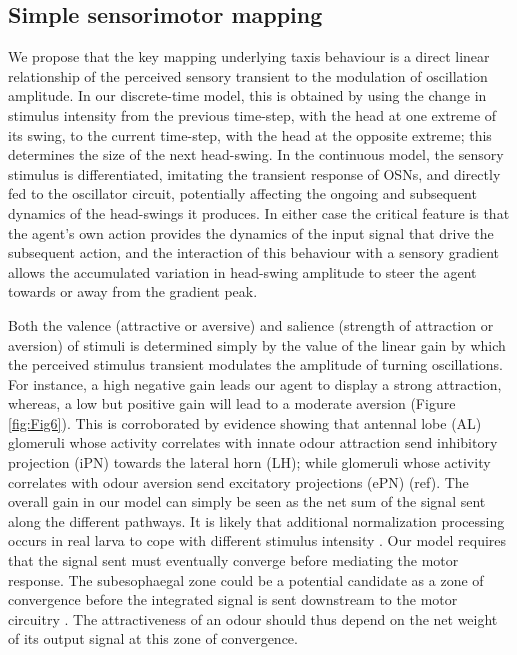 \documentclass[10pt,a4paper]{article}
\begin{document}
\subsection{Simple sensorimotor mapping}
We propose that the key mapping underlying taxis behaviour is a direct linear relationship of the perceived sensory transient to the modulation of oscillation amplitude. In our discrete-time model, this is obtained by using the change in stimulus intensity from the previous time-step, with the head at one extreme of its swing, to the current time-step, with the head at the opposite extreme; this determines the size of the next head-swing.  In the continuous model, the sensory stimulus is differentiated, imitating the transient response of OSNs, \cite{nagel2011biophysical,schulze2015dynamical} and directly fed to the oscillator circuit, potentially affecting the ongoing and subsequent dynamics of the head-swings it produces. In either case the critical feature is that the agent’s own action provides the dynamics of the input signal that drive the subsequent action, and the interaction of this behaviour with a sensory gradient allows the accumulated variation in head-swing amplitude to steer the agent towards or away from the gradient peak. 

Both the valence (attractive or aversive) and salience (strength of attraction or aversion) of stimuli is determined simply by the value of the linear gain by which the perceived stimulus transient modulates the amplitude of turning oscillations. For instance, a high negative gain leads our agent to display a strong attraction, whereas, a low but positive gain will lead to a moderate aversion (Figure \ref{fig:Fig6}). This is corroborated by evidence showing that antennal lobe (AL) glomeruli whose activity correlates with innate odour attraction send inhibitory projection (iPN) towards the lateral horn (LH); while glomeruli whose activity correlates with odour aversion send excitatory projections (ePN) (ref). The overall gain in our model can simply be seen as the net sum of the signal sent along the different pathways. It is likely that additional normalization processing occurs in real larva to cope with different stimulus intensity \cite[see for example odd neurons in][]{slater2015central}.
Our model requires that the signal sent must eventually converge before mediating the motor response. The subesophaegal zone could be a potential candidate as a zone of convergence before the integrated signal is sent downstream to the motor circuitry \cite{tastekin2015role}. The attractiveness of an odour should thus depend on the net weight of its output signal at this zone of convergence.   
  
\end{document}
